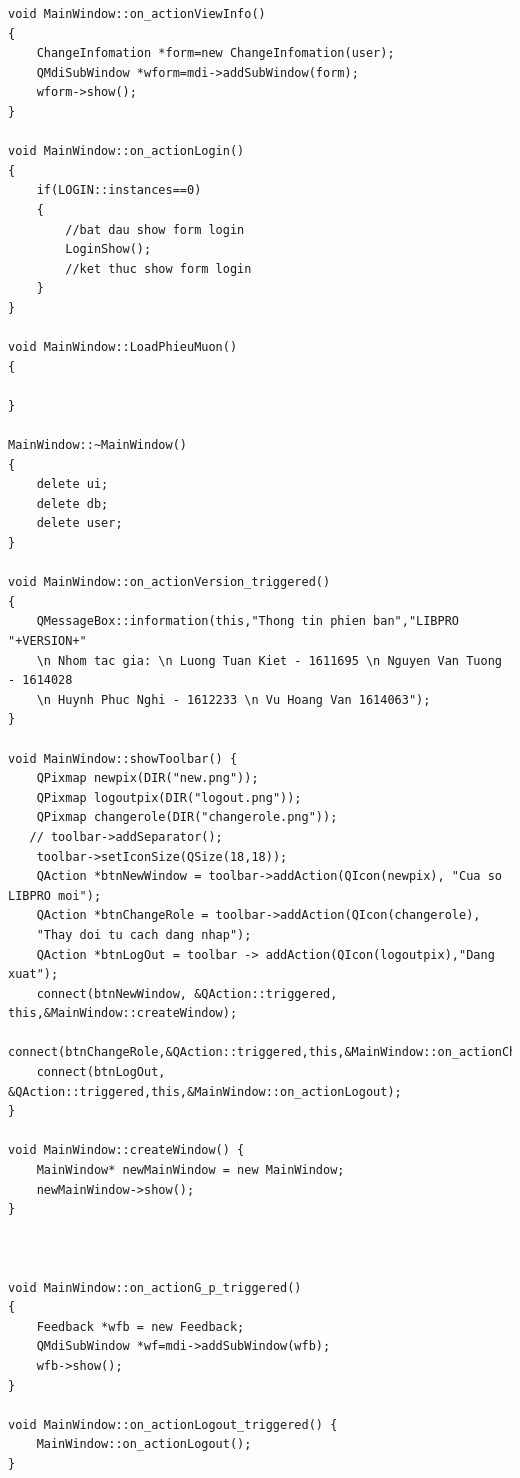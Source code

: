 \documentclass[a4paper]{article}
\begin{document}
\begin{lstlisting}
void MainWindow::on_actionViewInfo()
{
    ChangeInfomation *form=new ChangeInfomation(user);
    QMdiSubWindow *wform=mdi->addSubWindow(form);
    wform->show();
}

void MainWindow::on_actionLogin()
{
    if(LOGIN::instances==0)
    {
        //bat dau show form login
        LoginShow();
        //ket thuc show form login
    }
}

void MainWindow::LoadPhieuMuon()
{

}

MainWindow::~MainWindow()
{
    delete ui;
    delete db;
    delete user;
}

void MainWindow::on_actionVersion_triggered()
{
    QMessageBox::information(this,"Thong tin phien ban","LIBPRO "+VERSION+" 
    \n Nhom tac gia: \n Luong Tuan Kiet - 1611695 \n Nguyen Van Tuong - 1614028 
    \n Huynh Phuc Nghi - 1612233 \n Vu Hoang Van 1614063");
}

void MainWindow::showToolbar() {
    QPixmap newpix(DIR("new.png"));
    QPixmap logoutpix(DIR("logout.png"));
    QPixmap changerole(DIR("changerole.png"));
   // toolbar->addSeparator();
    toolbar->setIconSize(QSize(18,18));
    QAction *btnNewWindow = toolbar->addAction(QIcon(newpix), "Cua so LIBPRO moi");
    QAction *btnChangeRole = toolbar->addAction(QIcon(changerole),
    "Thay doi tu cach dang nhap");
    QAction *btnLogOut = toolbar -> addAction(QIcon(logoutpix),"Dang xuat");
    connect(btnNewWindow, &QAction::triggered, this,&MainWindow::createWindow);
    connect(btnChangeRole,&QAction::triggered,this,&MainWindow::on_actionChangeRole);
    connect(btnLogOut, &QAction::triggered,this,&MainWindow::on_actionLogout);
}

void MainWindow::createWindow() {
    MainWindow* newMainWindow = new MainWindow;
    newMainWindow->show();
}



void MainWindow::on_actionG_p_triggered()
{
    Feedback *wfb = new Feedback;
    QMdiSubWindow *wf=mdi->addSubWindow(wfb);
    wfb->show();
}

void MainWindow::on_actionLogout_triggered() {
    MainWindow::on_actionLogout();
}

\end{lstlisting}
\end{document}
